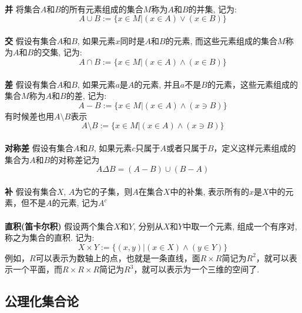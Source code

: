 \paragraph{}
\textbf{并} \:  将集合$A$和$B$的所有元素组成的集合$M$称为$A$和$B$的并集, 记为:
$$
A \cup B := \{x\in M | (x \in A) \lor (x \in B)\}
$$

\paragraph{}
\textbf{交} \:  假设有集合$A$和$B$, 如果元素$x$同时是$A$和$B$的元素, 而这些元素组成的集合$M$称为$A$和$B$的交集, 记为:
$$
A \cap B := \{ x \in M | (x \in A) \land (x \in B) \}
$$

\paragraph{}
\textbf{差} \:  假设有集合$A$和$B$, 如果元素$a$是$A$的元素, 并且$a$不是$B$的元素，这些元素组成的集合$M$称为$A$和$B$的差, 记为:
$$
A - B := \{ x \in M | (x \in A) \land (x \ni B) \}
$$
有时候差也用$A\setminus B$表示
$$
A \setminus B := \{ x \in M | (x \in A) \land (x \ni B) \}
$$

\paragraph{}
\textbf{对称差}\: 假设有集合$A$和$B$, 如果元素$c$只属于$A$或者只属于$B$，定义这样元素组成的集合为$A$和$B$的对称差记为
$$
A\Delta B = (A - B) \cup (B - A)
$$


\paragraph{}
\textbf{补} \:  假设有集合$X$, $A$为它的子集，则$A$在集合$X$中的补集, 表示所有的$x$是$X$中的元素，但不是$A$的元素, 记为$A^c$


\paragraph{}
\textbf{直积(笛卡尔积)} \:  假设两个集合$X$和$Y$, 分别从$X$和$Y$中取一个元素, 组成一个有序对, 称之为集合的直积. 记为:
$$
X \times Y := \{(x, y) | (x \in X) \land (y \in Y) \}
$$
例如，$R$可以表示为数轴上的点，也就是一条直线，面$R \times R$简记为$R^2$，就可以表示一个平面，而$R \times R \times R$简记为$R^3$，就可以表示为一个三维的空间了.


\subsection{公理化集合论}

